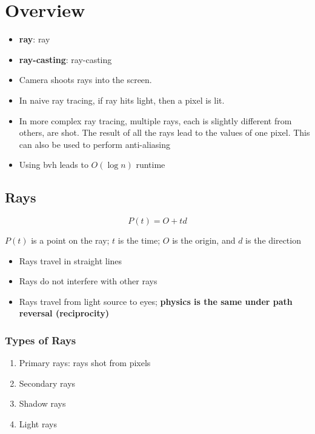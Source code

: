 \chapter{Overview}

\begin{itemize}
  \item \textbf{\Gls{ray}}: \Glsdesc{ray}
  \item \textbf{\Gls{ray-casting}}: \Glsdesc{ray-casting}
  \item Camera shoots rays into the screen.
  \item In naive ray tracing, if ray hits light, then a pixel is lit.
  \item In more complex ray tracing, multiple rays, each is slightly different
  from others, are shot. The result of all the rays lead to the values of one
  pixel. This can also be used to perform anti-aliasing
  \item Using \acrfull{bvh} leads to $ O\left( \log n \right) $ runtime
\end{itemize}

\section{Rays}

  \begin{equation}
    P\left( t \right) = O + td
  \end{equation}

  $ P\left( t \right) $ is a point on the ray; $ t $ is the time; $ O $ is
  the origin, and $ d $ is the direction

  \begin{itemize}
    \item Rays travel in straight lines
    \item Rays do not interfere with other rays
    \item Rays travel from light source to eyes; \textbf{physics is the same under
    path reversal (reciprocity)}
  \end{itemize}

  \subsection{Types of Rays}

    \begin{enumerate}
      \item Primary rays: rays shot from pixels
      \item Secondary rays
      \item Shadow rays
      \item Light rays
    \end{enumerate}

